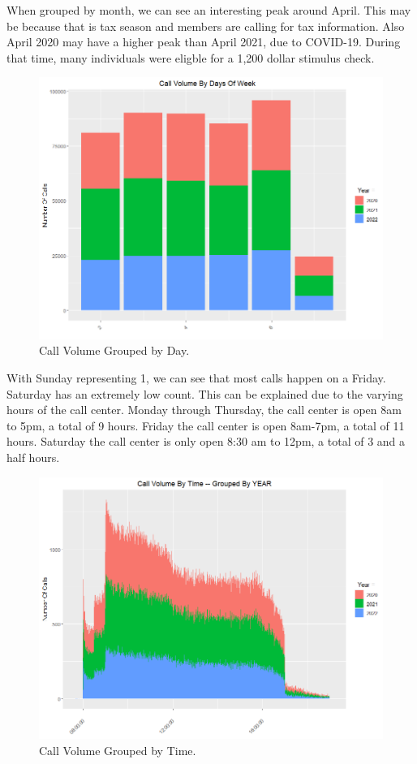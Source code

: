 \documentclass[12pt]{article}
\begin{document}
When grouped by month, we can see an interesting peak around April. This may be because that is tax season and members are calling for tax information.
Also April 2020 may have a higher peak than April 2021, due to COVID-19. During that time, many individuals were eligble for a 1,200 dollar stimulus check.
\begin{figure}[H]
  \centering
  \includegraphics[width=\textwidth]{CallVolumeByDayOfWeek.png}
  \caption{Call Volume Grouped by Day.}
  \label{fig:Day}
\end{figure}
With Sunday representing 1, we can see that most calls happen on a Friday. Saturday has an extremely low count. This can be explained due to the
varying hours of the call center. Monday through Thursday, the call center is open 8am to 5pm, a total of 9 hours. Friday the call center is open
8am-7pm, a total of 11 hours. Saturday the call center is only open 8:30 am to 12pm, a total of 3 and a half hours.
\begin{figure}[H]
  \centering
  \includegraphics[width=\textwidth]{CallVolumeByTimeOfDayGROUPEDbyYear.png}
  \caption{Call Volume Grouped by Time.}
  \label{fig:Timeoneday}
\end{figure}
\end{document}
